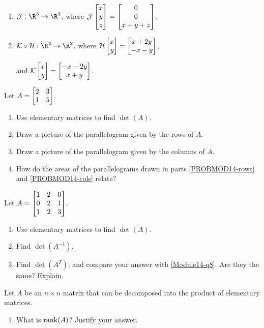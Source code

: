 \begin{exercises}
\begin{problist}
\begin{enumerate}
			\item $\mathcal{J}:\R^{3}\to\R^{3}$, where
				$\mathcal{J}\mat{x\\y\\z}=\matc{0\\0\\x+y+z}$.

			\item $\mathcal{K}\circ \mathcal{H}:\R^{2}\to\R^{2}$, where
				$\mathcal{H}\mat{x\\y}=\matc{x+2y\\-x-y}$,

				and $\mathcal{K}\mat{x\\y}=\matc{-x-2y\\x+y}$.
		\end{enumerate}

		\prob Let $A=\mat{2&3\\1&5}$.
		\begin{enumerate}
			\item Use elementary matrices to find $\det(A)$.

			\item Draw a picture of the parallelogram given by the rows of $A$.
				\label{PROBMOD14-rows}

			\item Draw a picture of the parallelogram given by the columns of $A$.
				\label{PROBMOD14-cols}

			\item How do the areas of the parallelograms drawn in parts \ref{PROBMOD14-rows}
				and \ref{PROBMOD14-cols} relate?
		\end{enumerate}

		\prob Let $A=\mat{1&2&0\\0&2&1\\1&2&3}$.
		\begin{enumerate}
			\item \label{Module14-q8} Use elementary matrices to find $\det(A)$.

			\item Find $\det(A^{-1})$.

			\item Find $\det(A^{T})$, and compare your answer with
				\ref{Module14-q8}. Are they the same? Explain.
		\end{enumerate}

		\prob Let $A$ be an $n \times n$ matrix that can be decomposed into the
		product of elementary matrices.
		\begin{enumerate}
			\item What is $\operatorname{rank}(A)$? Justify your answer.


\end{enumerate}
\end{problist}
\end{exercises}
